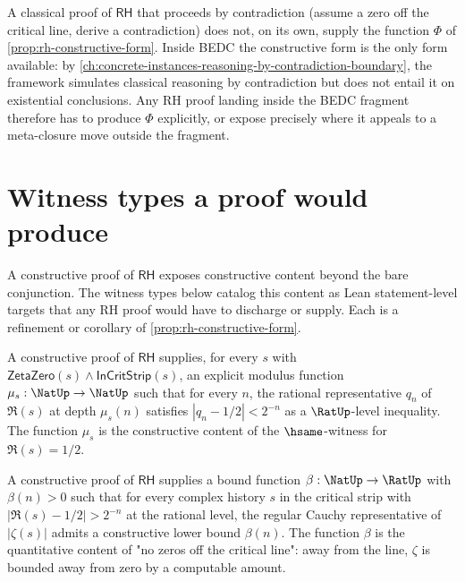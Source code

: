 \begin{remark}
\label{rem:rh-strictly-stronger}
A classical proof of $\mathsf{RH}$ that proceeds by contradiction (assume a zero off the critical line, derive a contradiction) does not, on its own, supply the function $\Phi$ of \autoref{prop:rh-constructive-form}. Inside BEDC the constructive form is the only form available: by \autoref{ch:concrete-instances-reasoning-by-contradiction-boundary}, the framework simulates classical reasoning by contradiction but does not entail it on existential conclusions. Any RH proof landing inside the BEDC fragment therefore has to produce $\Phi$ explicitly, or expose precisely where it appeals to a meta-closure move outside the fragment.
\end{remark}

\section{Witness types a proof would produce}
\label{sec:rh-witness-types}

A constructive proof of $\mathsf{RH}$ exposes constructive content beyond the bare conjunction. The witness types below catalog this content as Lean statement-level targets that any RH proof would have to discharge or supply. Each is a refinement or corollary of \autoref{prop:rh-constructive-form}.

\begin{theorem}
\label{thm:rh-witness-modulus}
A constructive proof of $\mathsf{RH}$ supplies, for every $s$ with $\mathsf{ZetaZero}(s) \wedge \mathsf{InCritStrip}(s)$, an explicit modulus function $\mu_s : \NatUp \to \NatUp$ such that for every $n$, the rational representative $q_n$ of $\Re(s)$ at depth $\mu_s(n)$ satisfies $|q_n - 1/2| < 2^{-n}$ as a $\RatUp$-level inequality. The function $\mu_s$ is the constructive content of the $\hsame$-witness for $\Re(s) = 1/2$.
\end{theorem}

\begin{theorem}
\label{thm:rh-witness-approach-rate}
A constructive proof of $\mathsf{RH}$ supplies a bound function $\beta : \NatUp \to \RatUp$ with $\beta(n) > 0$ such that for every complex history $s$ in the critical strip with $|\Re(s) - 1/2| > 2^{-n}$ at the rational level, the regular Cauchy representative of $|\zeta(s)|$ admits a constructive lower bound $\beta(n)$. The function $\beta$ is the quantitative content of "no zeros off the critical line": away from the line, $\zeta$ is bounded away from zero by a computable amount.
\end{theorem}

